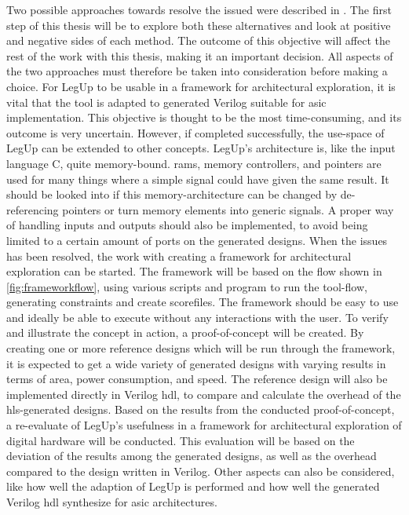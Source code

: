 \begin{enumerate}
 Two possible approaches towards resolve the issued were described in \cite{holm2015pro}. The first step of this thesis will be to explore both these alternatives and look at positive and negative sides of each method. The outcome of this objective will affect the rest of the work with this thesis, making it an important decision. All aspects of the two approaches must therefore be taken into consideration before making a choice.
 For LegUp to be usable in a framework for architectural exploration, it is vital that the tool is adapted to generated Verilog suitable for \gls{asic} implementation. This objective is thought to be the most time-consuming, and its outcome is very uncertain. However, if completed successfully, the use-space of LegUp can be extended to other concepts. LegUp’s architecture is, like the input language C, quite memory-bound. \gls{ram}s, memory controllers, and pointers are used for many things where a simple signal could have given the same result. It should be looked into if this memory-architecture can be changed by de-referencing pointers or turn memory elements into generic signals. A proper way of handling inputs and outputs should also be implemented, to avoid being limited to a certain amount of ports on the generated designs.
 When the issues has been resolved, the work with creating a framework for architectural exploration can be started. The framework will be based on the flow shown in \cref{fig:frameworkflow}, using various scripts and program to run the tool-flow, generating constraints and create scorefiles. The framework should be easy to use and ideally be able to execute without any interactions with the user.
 To verify and illustrate the concept in action, a proof-of-concept will be created. By creating one or more reference designs which will be run through the framework, it is expected to get a wide variety of generated designs with varying results in terms of area, power consumption, and speed. The reference design will also be implemented directly in Verilog \gls{hdl}, to compare and calculate the overhead of the \gls{hls}-generated designs.
 Based on the results from the conducted proof-of-concept, a re-evaluate of LegUp's usefulness in a framework for architectural exploration of digital hardware will be conducted. This evaluation will be based on the deviation of the results among the generated designs, as well as the overhead compared to the design written in Verilog. Other aspects can also be considered, like how well the adaption of LegUp is performed and how well the generated Verilog \gls{hdl} synthesize for \gls{asic} architectures.

\end{enumerate}
